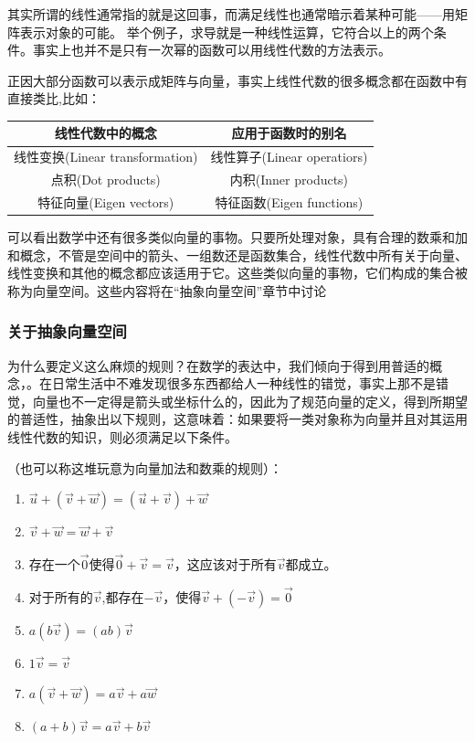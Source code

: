 \documentclass[UTF8]{ctexbook}
\begin{document}
{{{{  其实所谓的线性通常指的就是这回事，而满足线性也通常暗示着某种可能——用矩阵表示对象的可能。
  举个例子，求导就是一种线性运算，它符合以上的两个条件。事实上也并不是只有一次幂的函数可以用线性代数的方法表示。

  正因大部分函数可以表示成矩阵与向量，事实上线性代数的很多概念都在函数中有直接类比,比如：

  \begin{tabular}{c|c}
    \hline
    线性代数中的概念                & 应用于函数时的别名          \\
    \hline
    线性变换(Linear transformation) & 线性算子(Linear operatiors) \\
    点积(Dot products)              & 内积(Inner products)        \\
    特征向量(Eigen vectors)         & 特征函数(Eigen functions)
  \end{tabular}

  可以看出数学中还有很多类似向量的事物。只要所处理对象，具有合理的数乘和加和概念，不管是空间中的箭头、一组数还是函数集合，线性代数中所有关于向量、线性变换和其他的概念都应该适用于它。这些类似向量的事物，它们构成的集合被称为向量空间。这些内容将在“抽象向量空间”章节中讨论
}%

\subsubsection{关于抽象向量空间}{
为什么要定义这么麻烦的规则？在数学的表达中，我们倾向于得到用普适的概念，{}。在日常生活中不难发现很多东西都给人一种线性的错觉，事实上那不是错觉，向量也不一定得是箭头或坐标什么的，因此为了规范向量的定义，得到所期望的普适性，抽象出以下规则，这意味着：如果要将一类对象称为向量并且对其运用线性代数的知识，则必须满足以下条件。

（也可以称这堆玩意为向量加法和数乘的规则）：
\begin{enumerate}
  \item $\vec{u} + (\vec{v} + \vec{w}) = (\vec{u} + \vec{v}) + \vec{w}$
  \item $\vec{v} + \vec{w} = \vec{w} + \vec{v}$
  \item 存在一个$\vec{0}$使得$\vec{0} + \vec{v} = \vec{v}$，这应该对于所有$\vec{v}$都成立。
  \item 对于所有的$\vec{v}$,都存在$-\vec{v}$，使得$\vec{v} + (-\vec{v}) = \vec{0}$
  \item $a(b\vec{v}) = (ab)\vec{v}$
  \item $1\vec{v} = \vec{v}$
  \item $a(\vec{v} + \vec{w}) = a\vec{v} + a\vec{w}$
  \item $(a + b)\vec{v} = a\vec{v} + b\vec{v}$
\end{enumerate}

}}}}
\end{document}
